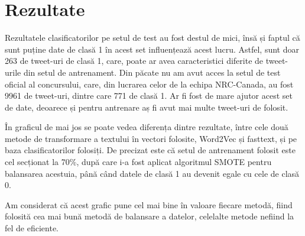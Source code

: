 \chapter{Rezultate}

Rezultatele clasificatorilor pe setul de test au fost destul de mici, însă și faptul că sunt puține date
de clasă 1 în acest set influențează acest lucru. Astfel, sunt doar 263 de tweet-uri de clasă 1, care, poate
ar avea caracteristici diferite de tweet-urile din setul de antrenament. Din păcate nu am avut acces la 
setul de test oficial al concursului, care, din lucrarea celor de la echipa NRC-Canada, au fost 9961 de tweet-uri,
dintre care 771 de clasă 1. Ar fi fost de mare ajutor acest set de date, deoarece și pentru antrenare aș fi avut mai
multe tweet-uri de folosit. 

În graficul de mai jos se poate vedea diferența dintre rezultate, între cele două metode de transformare a textului 
în vectori folosite, Word2Vec și fasttext, și pe baza clasificatorilor folosiți. De precizat este că setul de antrenament
folosit este cel secționat la 70\%, după care i-a fost aplicat algoritmul SMOTE pentru balansarea acestuia, până când
datele de clasă 1 au devenit egale cu cele de clasă 0.


Am considerat că acest grafic pune cel mai bine în valoare fiecare metodă, fiind folosită cea mai bună
metodă de balansare a datelor, celelalte metode nefiind la fel de eficiente.